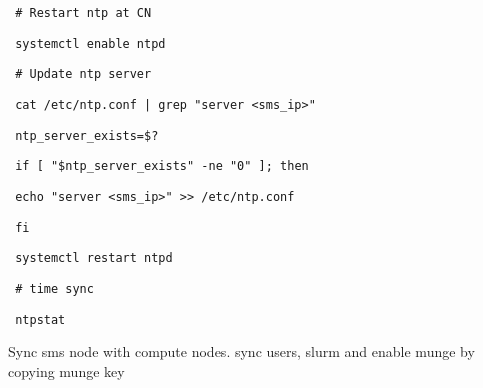 \begin{section}
\begin{bash}\texttt{\small{ \# Restart ntp at CN}}\end{bash}
\begin{bash}\texttt{\small{ systemctl enable ntpd}}\end{bash}
\begin{bash}\texttt{\small{ \# Update ntp server}}\end{bash}
\begin{bash}\texttt{\small{ cat /etc/ntp.conf | grep "server <sms\_ip>"}}\end{bash}
\begin{bash}\texttt{\small{ ntp\_server\_exists=\$?}}\end{bash}
\begin{bash}\texttt{\small{ if [ "\${ntp\_server\_exists}" -ne "0" ]; then}}\end{bash}
\begin{bash}\texttt{\small{     echo "server <sms\_ip>" >> /etc/ntp.conf}}\end{bash}
\begin{bash}\texttt{\small{ fi}}\end{bash}
\begin{bash}\texttt{\small{ systemctl restart ntpd}}\end{bash}
\begin{bash}\texttt{\small{ \# time sync}}\end{bash}
\begin{bash}\texttt{\small{ ntpstat}}\end{bash}

Sync sms node with compute nodes. sync users, slurm and enable munge by copying munge key


\end{section}
